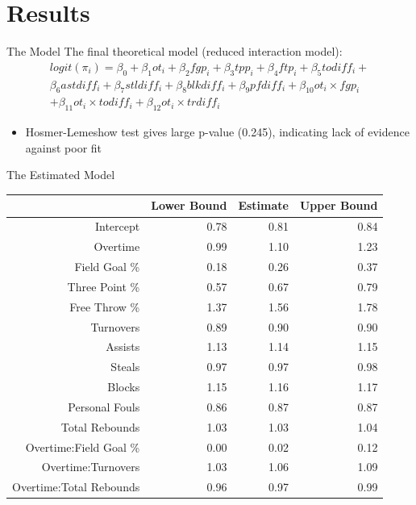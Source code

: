 \documentclass{beamer}
\begin{document}
\section{Results}

	\begin{frame}{The Model}
	The final theoretical model (reduced interaction model): 
	\begin{multline*}
	logit(\pi_{i})=\beta_{0}+\beta_{1}ot_{i}+\beta_{2}fgp_{i}+\beta_{3}tpp_{i}+\beta_{4}ftp_{i}+\beta_{5}todiff_{i}+\\
	\beta_{6}astdiff_{i}+\beta_{7}stldiff_{i}+\beta_{8}blkdiff_{i}+\beta_{9}pfdiff_{i}+\beta_{10}ot_{i}\times fgp_{i}\\
	+\beta_{11}ot_{i}\times todiff_{i}+\beta_{12}ot_{i}\times trdiff_{i}
	\end{multline*}
\begin{itemize}
	\item Hosmer-Lemeshow test gives large p-value (0.245), indicating lack of evidence against poor fit
\end{itemize}	
\end{frame}	

\begin{frame}{The Estimated Model}
\begin{table}[ht]
	\centering
	\begin{tabular}{rrrr}
		\hline
		& Lower Bound & Estimate & Upper Bound \\ 
		\hline
		Intercept & 0.78 & 0.81 & 0.84 \\ 
		Overtime & 0.99 & 1.10 & 1.23 \\ 
		Field Goal \% & 0.18 & 0.26 & 0.37 \\ 
		Three Point \% & 0.57 & 0.67 & 0.79 \\ 
		Free Throw \% & 1.37 & 1.56 & 1.78 \\ 
		Turnovers & 0.89 & 0.90 & 0.90 \\ 
		Assists & 1.13 & 1.14 & 1.15 \\ 
		Steals & 0.97 & 0.97 & 0.98 \\ 
		Blocks & 1.15 & 1.16 & 1.17 \\ 
		Personal Fouls & 0.86 & 0.87 & 0.87 \\ 
		Total Rebounds & 1.03 & 1.03 & 1.04 \\ 
		Overtime:Field Goal \% & 0.00 & 0.02 & 0.12 \\ 
		Overtime:Turnovers & 1.03 & 1.06 & 1.09 \\ 
		Overtime:Total Rebounds & 0.96 & 0.97 & 0.99 \\ 
		\hline
	\end{tabular}
\end{table}
\end{frame}	
\end{document}
